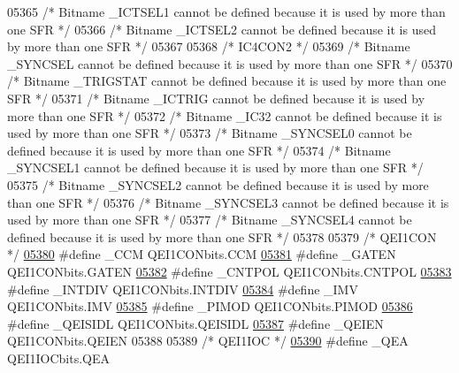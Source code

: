 \begin{DoxyCode}
05365 \textcolor{comment}{/* Bitname \_ICTSEL1 cannot be defined because it is used by more than one SFR */}
05366 \textcolor{comment}{/* Bitname \_ICTSEL2 cannot be defined because it is used by more than one SFR */}
05367 
05368 \textcolor{comment}{/* IC4CON2 */}
05369 \textcolor{comment}{/* Bitname \_SYNCSEL cannot be defined because it is used by more than one SFR */}
05370 \textcolor{comment}{/* Bitname \_TRIGSTAT cannot be defined because it is used by more than one SFR */}
05371 \textcolor{comment}{/* Bitname \_ICTRIG cannot be defined because it is used by more than one SFR */}
05372 \textcolor{comment}{/* Bitname \_IC32 cannot be defined because it is used by more than one SFR */}
05373 \textcolor{comment}{/* Bitname \_SYNCSEL0 cannot be defined because it is used by more than one SFR */}
05374 \textcolor{comment}{/* Bitname \_SYNCSEL1 cannot be defined because it is used by more than one SFR */}
05375 \textcolor{comment}{/* Bitname \_SYNCSEL2 cannot be defined because it is used by more than one SFR */}
05376 \textcolor{comment}{/* Bitname \_SYNCSEL3 cannot be defined because it is used by more than one SFR */}
05377 \textcolor{comment}{/* Bitname \_SYNCSEL4 cannot be defined because it is used by more than one SFR */}
05378 
05379 \textcolor{comment}{/* QEI1CON */}
\hypertarget{a00009_source_l05380}{}\hyperlink{a00009_ae942122648cf5964ccf7051bbe207deb}{05380} \textcolor{preprocessor}{#define \_CCM QEI1CONbits.CCM}
\hypertarget{a00009_source_l05381}{}\hyperlink{a00009_a6a71a69f82c8b698c6da5a0251c5545b}{05381} \textcolor{preprocessor}{#define \_GATEN QEI1CONbits.GATEN}
\hypertarget{a00009_source_l05382}{}\hyperlink{a00009_a0df96963175459cd315e9a22e40a4103}{05382} \textcolor{preprocessor}{#define \_CNTPOL QEI1CONbits.CNTPOL}
\hypertarget{a00009_source_l05383}{}\hyperlink{a00009_a8c807c487ee98e616cb05375ea698c32}{05383} \textcolor{preprocessor}{#define \_INTDIV QEI1CONbits.INTDIV}
\hypertarget{a00009_source_l05384}{}\hyperlink{a00009_ac100a07f49b1f8f93bbe1f801ff7a815}{05384} \textcolor{preprocessor}{#define \_IMV QEI1CONbits.IMV}
\hypertarget{a00009_source_l05385}{}\hyperlink{a00009_a07603307dbd9b4c727b35190145fb076}{05385} \textcolor{preprocessor}{#define \_PIMOD QEI1CONbits.PIMOD}
\hypertarget{a00009_source_l05386}{}\hyperlink{a00009_a6400837b56af913898a3461252a8bb04}{05386} \textcolor{preprocessor}{#define \_QEISIDL QEI1CONbits.QEISIDL}
\hypertarget{a00009_source_l05387}{}\hyperlink{a00009_aefbc9d2b99e8a5fa02293082e0be0869}{05387} \textcolor{preprocessor}{#define \_QEIEN QEI1CONbits.QEIEN}
05388 
05389 \textcolor{comment}{/* QEI1IOC */}
\hypertarget{a00009_source_l05390}{}\hyperlink{a00009_a0b61c1a775ea81841b8dc27bb53469cb}{05390} \textcolor{preprocessor}{#define \_QEA QEI1IOCbits.QEA}

\end{DoxyCode}
